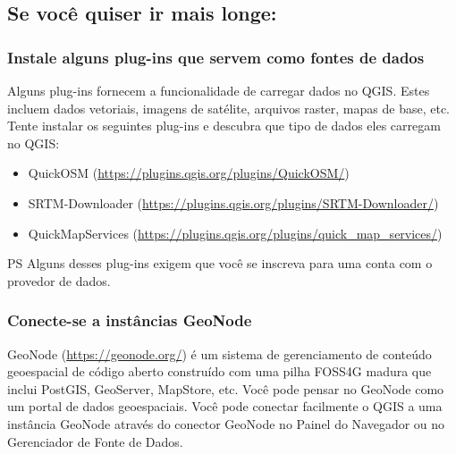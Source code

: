 \documentclass[
]{book}
\providecommand{\tightlist}{%
  \setlength{\itemsep}{0pt}\setlength{\parskip}{0pt}}
\begin{document}
\hypertarget{se-vocuxea-quiser-ir-mais-longe-2}{%
\subsection{Se você quiser ir mais longe:}\label{se-vocuxea-quiser-ir-mais-longe-2}}

\hypertarget{instale-alguns-plug-ins-que-servem-como-fontes-de-dados}{%
\subsubsection{\texorpdfstring{\textbf{Instale alguns plug-ins que servem como fontes de dados}}{Instale alguns plug-ins que servem como fontes de dados}}\label{instale-alguns-plug-ins-que-servem-como-fontes-de-dados}}

Alguns plug-ins fornecem a funcionalidade de carregar dados no QGIS. Estes incluem dados vetoriais, imagens de satélite, arquivos raster, mapas de base, etc. Tente instalar os seguintes plug-ins e descubra que tipo de dados eles carregam no QGIS:

\begin{itemize}
\tightlist
\item
  QuickOSM (\url{https://plugins.qgis.org/plugins/QuickOSM/})
\item
  SRTM-Downloader (\url{https://plugins.qgis.org/plugins/SRTM-Downloader/})
\item
  QuickMapServices (\url{https://plugins.qgis.org/plugins/quick_map_services/})
\end{itemize}

PS Alguns desses plug-ins exigem que você se inscreva para uma conta com o provedor de dados.

\hypertarget{conecte-se-a-instuxe2ncias-geonode}{%
\subsubsection{\texorpdfstring{\textbf{Conecte-se a instâncias GeoNode}}{Conecte-se a instâncias GeoNode}}\label{conecte-se-a-instuxe2ncias-geonode}}

GeoNode (\url{https://geonode.org/}) é um sistema de gerenciamento de conteúdo geoespacial de código aberto construído com uma pilha FOSS4G madura que inclui PostGIS, GeoServer, MapStore, etc. Você pode pensar no GeoNode como um portal de dados geoespaciais. Você pode conectar facilmente o QGIS a uma instância GeoNode através do conector GeoNode no Painel do Navegador ou no Gerenciador de Fonte de Dados.
\end{document}
